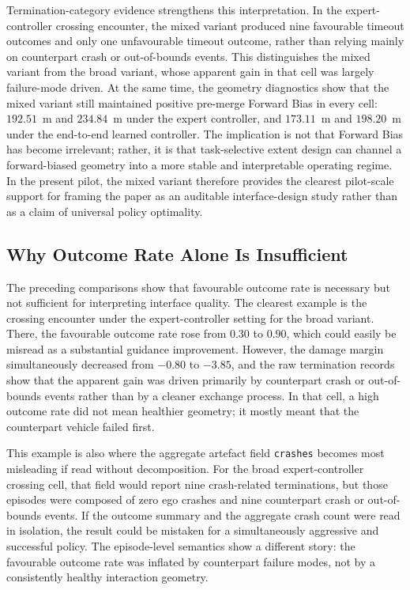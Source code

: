 \documentclass[drones,article,submit,pdftex,moreauthors]{Definitions/mdpi}
\begin{document}
Termination-category evidence strengthens this interpretation. In the expert-controller crossing encounter, the mixed variant produced nine favourable timeout outcomes and only one unfavourable timeout outcome, rather than relying mainly on counterpart crash or out-of-bounds events. This distinguishes the mixed variant from the broad variant, whose apparent gain in that cell was largely failure-mode driven. At the same time, the geometry diagnostics show that the mixed variant still maintained positive pre-merge Forward Bias in every cell: $192.51$~m and $234.84$~m under the expert controller, and $173.11$~m and $198.20$~m under the end-to-end learned controller. The implication is not that Forward Bias has become irrelevant; rather, it is that task-selective extent design can channel a forward-biased geometry into a more stable and interpretable operating regime. In the present pilot, the mixed variant therefore provides the clearest pilot-scale support for framing the paper as an auditable interface-design study rather than as a claim of universal policy optimality.

\subsection{Why Outcome Rate Alone Is Insufficient}

The preceding comparisons show that favourable outcome rate is necessary but not sufficient for interpreting interface quality. The clearest example is the crossing encounter under the expert-controller setting for the broad variant. There, the favourable outcome rate rose from $0.30$ to $0.90$, which could easily be misread as a substantial guidance improvement. However, the damage margin simultaneously decreased from $-0.80$ to $-3.85$, and the raw termination records show that the apparent gain was driven primarily by counterpart crash or out-of-bounds events rather than by a cleaner exchange process. In that cell, a high outcome rate did not mean healthier geometry; it mostly meant that the counterpart vehicle failed first.

This example is also where the aggregate artefact field \texttt{crashes} becomes most misleading if read without decomposition. For the broad expert-controller crossing cell, that field would report nine crash-related terminations, but those episodes were composed of zero ego crashes and nine counterpart crash or out-of-bounds events. If the outcome summary and the aggregate crash count were read in isolation, the result could be mistaken for a simultaneously aggressive and successful policy. The episode-level semantics show a different story: the favourable outcome rate was inflated by counterpart failure modes, not by a consistently healthy interaction geometry.
\end{document}
